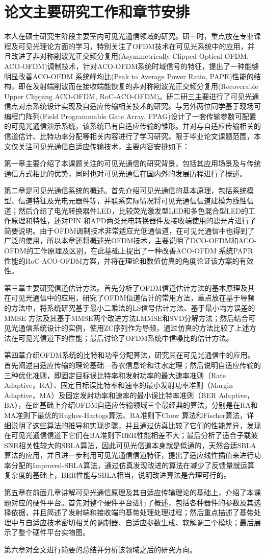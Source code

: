 \section{论文主要研究工作和章节安排}\label{sec:concept}
本人在硕士研究生阶段主要室内可见光通信领域的研究。研一时，重点放在专业课程及可见光理论方面的学习，特别关注了OFDM技术在可见光系统中的应用，并且改进了非对称削波光正交频分复用(Asymmetrically Clipped Optical OFDM, ACO-OFDM)调制技术，针对ACO-OFDM系统时域信号的特征，提出了一种能够明显改善ACO-OFDM 系统峰均比(Peak to Average Power Ratio, PAPR)性能的结构，即在发射端削波而在接收端能恢复的非对称削波光正交频分复用(Recoverable Upper Clipping ACO-OFDM, RoC-ACO-OFDM)\cite{xu2014aco}。研二研三主要进行了可见光通信点对点系统设计实现及自适应传输相关技术的研究。与另外两位同学基于现场可编程门阵列(Field Programmable Gate Array, FPAG)设计了一套传输参数可配置的可见光通信演示系统，该系统已有自适应传输的雏形。并对与自适应传输相关的信道估计、比特功率分配等相关内容进行了学习研究。限于毕业论文课题范围，本文仅关注可见光通信自适应传输技术，主要内容安排如下：

第一章主要介绍了本课题关注的可见光通信的研究背景，包括其应用场景及与传统通信方式相比的优势，同时也对可见光通信在国内外的发展历程进行了概述。

第二章是可见光通信系统的概述。首先介绍可见光通信的基本原理，包括系统模型、信道特征及光电元器件等，并联系实际情况将可见光通信信道建模为线性信道；然后介绍了电光转换器件LED，比较荧光激发型LED和多色混合型LED的工作原理和特性，还对PIN 和APD两类光电转换器件及接收端使用的滤光片进行了简要说明。由于OFDM调制技术非常适应光低通信道，在可见光通信中也得到了广泛的使用，所以本章还将概述光OFDM技术，主要说明了DCO-OFDM和ACO-OFDM的工作原理及区别，在此基础上提出了一种改善ACO-OFDM 系统PAPR 性能的RoC-ACO-OFDM方案，并将在理论和数值仿真的角度论证该方案的有效性。

第三章主要研究信道估计方法。首先分析了OFDM信道估计方法的基本原理及其在可见光通信中的应用，研究了OFDM信道估计的常用方法，重点放在基于导频的方法中，将系统研究基于最小二乘法的LS信号估计方法、基于最小均方误差的MMSE 方法及其基于MMSE两个改进方法LMMSE和SVD分解方法；然后结合可见光通信系统设计的实例，使用ZC序列作为导频，通过仿真的方法比较了上述方法在可见光信道下的性能；最后讨论了OFDM系统中信噪比的估计方法。

第四章介绍OFDM系统的比特和功率分配算法，研究其在可见光通信中的应用。首先阐述自适应传输的理论基础—香农信息论和注水定理；然后说明自适应传输的三种优化准则，即固定目标误比特率和发射功率的最大速率准则（Rate Adaptive，RA）、固定目标误比特率和速率的最小发射功率准则（Margin Adaptive，MA）及固定发射功率和速率的最小误比特率准则（BER Adaptive，BA），在此基础上介绍OFDM自适应传输领域三个最经典的算法，分别是在RA和MA准则下最优的Hughes-Hartogs算法、BA准则下Chow 算法和Fischer算法，详细说明了这些算法的推导和实现步骤，并且通过仿真比较了它们的性能差异，发现在可见光通信信道下它们在BA准则下BER性能相差不大；最后分析了适合子载波SNR相关性较大的SBLA算法，因此可见光信道本身就是低通的，天然合适SBLA算法的应用，并且进一步利用可见光通信信道特征，提出了适应线性插值来进行功率分配的Improved-SBLA算法，通过仿真发现改进的算法在减少了反馈量就运算复杂度的基础上，BER性能与SBLA相当，说明改进算法是合理可行的。

第五章在前面几章讲解可见光通信原理及其自适应传输理论的基础上，介绍了本课题对应的硬件平台。首先对整个硬件平台进行了概述，包括各种器件的参数及其选择依据，并且简述了发射端和接收端的基带处理处理过程；然后重点描述了基带处理中与自适应技术密切相关的调制器、自适应参数生成、软解调三个模块；最后展示了整个硬件平台实物图。

第六章对全文进行简要的总结并分析该领域之后的研究方向。
